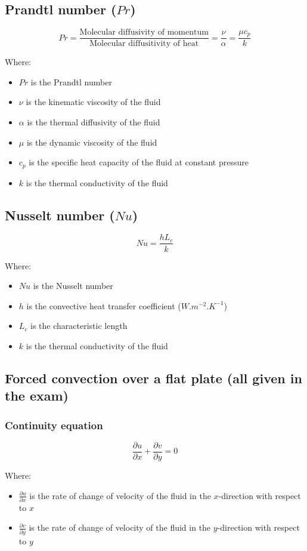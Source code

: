 \documentclass[11pt]{article}
\begin{document}
\subsection{Prandtl number (\(Pr\))}
\label{sec:org38b06f8}
\[Pr = \frac{\text{Molecular diffusivity of momentum}}{\text{Molecular diffusitivity of heat}} = \frac{\nu}{\alpha} = \frac{\mu c_p}{k}\]

Where:
\begin{itemize}
\item \(Pr\) is the Prandtl number
\item \(\nu\) is the kinematic viscosity of the fluid
\item \(\alpha\) is the thermal diffusivity of the fluid
\item \(\mu\) is the dynamic viscosity of the fluid
\item \(c_p\) is the specific heat capacity of the fluid at constant pressure
\item \(k\) is the thermal conductivity of the fluid
\end{itemize}
\subsection{Nusselt number (\(Nu\))}
\label{sec:orgf45b1a4}
\[Nu = \frac{hL_c}{k}\]

Where:
\begin{itemize}
\item \(Nu\) is the Nusselt number
\item \(h\) is the convective heat transfer coefficient (\(\unit{W.m^{-2}.K^{-1}}\))
\item \(L_c\) is the characteristic length
\item \(k\) is the thermal conductivity of the fluid
\end{itemize}
\subsection{Forced convection over a flat plate (all given in the exam)}
\label{sec:org5cd4f03}

\subsubsection{Continuity equation}
\label{sec:org8d2fc76}
\[\frac{\partial u}{\partial x} + \frac{\partial v}{\partial y} = 0\]

Where:
\begin{itemize}
\item \(\frac{\partial u}{\partial x}\) is the rate of change of velocity of the fluid in the \(x\)-direction with respect to \(x\)
\item \(\frac{\partial v}{\partial y}\) is the rate of change of velocity of the fluid in the \(y\)-direction with respect to \(y\)
\end{itemize}
\end{document}
